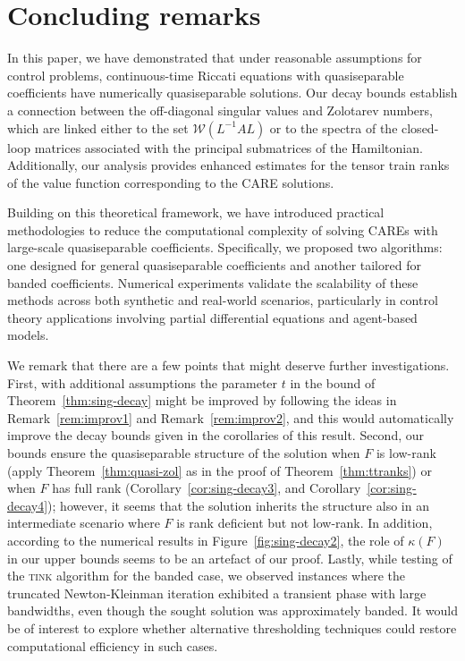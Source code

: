 \documentclass[a4paper,10pt]{article}
\newcommand{\upd}[1]{{\color{black}#1}} %
\begin{document}
\section{Concluding remarks}\label{sec:conclusion}
In this paper, we have demonstrated that under reasonable assumptions for control problems, continuous-time Riccati equations with quasiseparable coefficients have numerically quasiseparable solutions. Our decay bounds establish a connection between the off-diagonal singular values and Zolotarev numbers, which are linked either to the set $\mathcal{W}(L^{-1}AL)$ or to the spectra of the closed-loop matrices associated with the principal submatrices of the Hamiltonian. Additionally, our analysis provides enhanced estimates for the tensor train ranks of the value function corresponding to the CARE solutions.

Building on this theoretical framework, we have introduced practical methodologies to reduce the computational complexity of solving CAREs with large-scale quasiseparable coefficients. Specifically, we proposed two algorithms: one designed for general quasiseparable coefficients and another tailored for banded coefficients. Numerical experiments validate the scalability of these methods across both synthetic and real-world scenarios, particularly in control theory applications involving partial differential equations and agent-based models.

We remark that there are a few points that might deserve further investigations. First, with additional assumptions the parameter $t$ in the bound of Theorem~\ref{thm:sing-decay} might be improved by following the ideas in Remark~\ref{rem:improv1} and Remark~\ref{rem:improv2}, and this would automatically improve the decay bounds given in the corollaries of this result. Second, our bounds ensure the quasiseparable structure of the solution when $F$ is low-rank (apply Theorem~\ref{thm:quasi-zol} as in the proof of Theorem~\ref{thm:ttranks}) or when $F$ \upd{has} full rank (Corollary~\ref{cor:sing-decay3}, and Corollary~\ref{cor:sing-decay4}); however, it seems that the solution inherits the structure also in an intermediate scenario where $F$ is rank  deficient but not low-rank. In addition, according to the numerical results in Figure~\ref{fig:sing-decay2}, the role of $\kappa(F)$ in our upper bounds seems to be an artefact of our proof. Lastly, while testing of the \textsc{tink} algorithm for the banded case, we observed instances where the truncated Newton-Kleinman iteration exhibited a transient phase with large bandwidths, even though the sought solution was approximately banded. It would be of interest to explore whether alternative thresholding techniques could restore computational efficiency in such cases.
\end{document}
